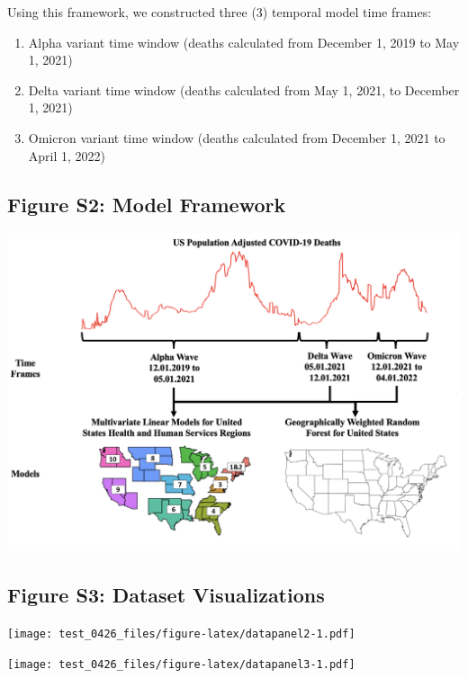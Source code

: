 \documentclass[
]{article}
\providecommand{\tightlist}{%
  \setlength{\itemsep}{0pt}\setlength{\parskip}{0pt}}
\begin{document}
Using this framework, we constructed three (3) temporal model time
frames:

\begin{enumerate}
\def\labelenumi{\arabic{enumi}.}
\tightlist
\item
  Alpha variant time window (deaths calculated from December 1, 2019 to
  May 1, 2021)
\item
  Delta variant time window (deaths calculated from May 1, 2021, to
  December 1, 2021)
\item
  Omicron variant time window (deaths calculated from December 1, 2021
  to April 1, 2022)
\end{enumerate}

\newpage

\hypertarget{figure-s2-model-framework}{%
\subsection{Figure S2: Model
Framework}\label{figure-s2-model-framework}}

\includegraphics[width=1\textwidth,height=1\textheight]{../figures/model.png}

\newpage

\hypertarget{figure-s3-dataset-visualizations}{%
\subsection{Figure S3: Dataset
Visualizations}\label{figure-s3-dataset-visualizations}}

\texttt{[image: test\_0426\_files/figure-latex/datapanel2-1.pdf]}

\texttt{[image: test\_0426\_files/figure-latex/datapanel3-1.pdf]}
\end{document}
